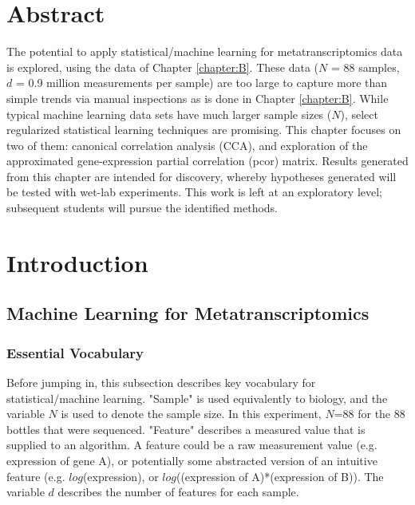 
\section{Abstract}

The potential to apply statistical/machine learning for metatranscriptomics data is explored, using the data of Chapter \ref{chapter:B}.
These data ($N$  = 88 samples, $d$ = 0.9 million measurements per sample) are too large to capture more than simple trends via manual inspections as is done in Chapter \ref{chapter:B}.
While typical machine learning data sets have much larger sample sizes ($N$), select regularized statistical learning techniques are promising.
This chapter focuses on two of them: canonical correlation analysis (CCA), and exploration of the approximated gene-expression partial correlation (pcor) matrix.
Results generated from this chapter are intended for discovery, whereby hypotheses generated will be tested with wet-lab experiments.
This work is left at an exploratory level; subsequent students will pursue the identified methods.


\section{Introduction}

\subsection{Machine Learning for Metatranscriptomics}

\subsubsection{Essential Vocabulary}

Before jumping in, this subsection describes key vocabulary for statistical/machine learning.
"Sample" is used equivalently to biology, and the variable $N$ is used to denote the sample size.
In this experiment, $N$=88 for the 88 bottles that were sequenced.
"Feature" describes a measured value that is supplied to an algorithm.
A feature could be a raw measurement value (e.g. expression of gene A), or potentially some abstracted version of an intuitive feature (e.g. $log$(expression), or $log$((expression of A)*(expression of B)).
The variable $d$ describes the number of features for each sample.

